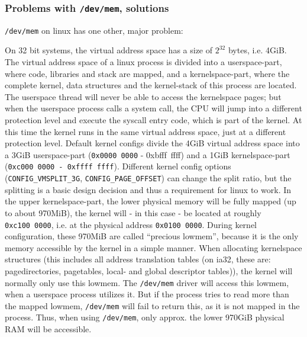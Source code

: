 \subsubsection{Problems with \texttt{/dev/mem}, solutions}

\texttt{/dev/mem} on linux has one other, major problem:

On 32 bit systems, the virtual address space has a size of $2^{32}$ bytes, i.e.
4GiB.  The virtual address space of a linux process is divided into a
userspace-part, where code, libraries and stack are mapped, and a
kernelspace-part, where the complete kernel, data structures and the
kernel-stack of this process are located. The userspace thread will never be
able to access the kernelspace pages; but when the userspace process calls a
system call, the CPU will jump into a different protection level and execute the
syscall entry code, which is part of the kernel. At this time the kernel runs in
the same virtual address space, just at a different protection level. Default
kernel configs divide the 4GiB virtual address space into a 3GiB userspace-part
(\texttt{0x0000~0000} - {0xbfff~ffff}) and a 1GiB kernelspace-part
(\texttt{0xc000~0000 - 0xffff~ffff}).  Different kernel config options
(\texttt{CONFIG\_VMSPLIT\_3G}, \texttt{CONFIG\_PAGE\_OFFSET}) can change the
split ratio, but the splitting is a basic design decision and thus a requirement
for linux to work. In the upper kernelspace-part, the lower physical memory will
be fully mapped (up to about 970MiB), the kernel will - in this case - be
located at roughly \texttt{0xc100~0000}, i.e. at the physical address
\texttt{0x0100~0000}. During kernel configuration, these 970MiB are called
``precious lowmem'', because it is the only memory accessible by the kernel in a
simple manner. When allocating kernelspace structures (this includes all address
translation tables (on ia32, these are: pagedirectories, pagetables, local- and
global descriptor tables)\label{linuxATTinlowmem}), the kernel will normally
only use this lowmem.  The \texttt{/dev/mem} driver will access this lowmem,
when a userspace process utilizes it. But if the process tries to read more than
the mapped lowmem, \texttt{/dev/mem} will fail to return this, as it is not
mapped in the process.  Thus, when using \texttt{/dev/mem}, only approx.  the
lower 970GiB physical RAM will be accessible.

